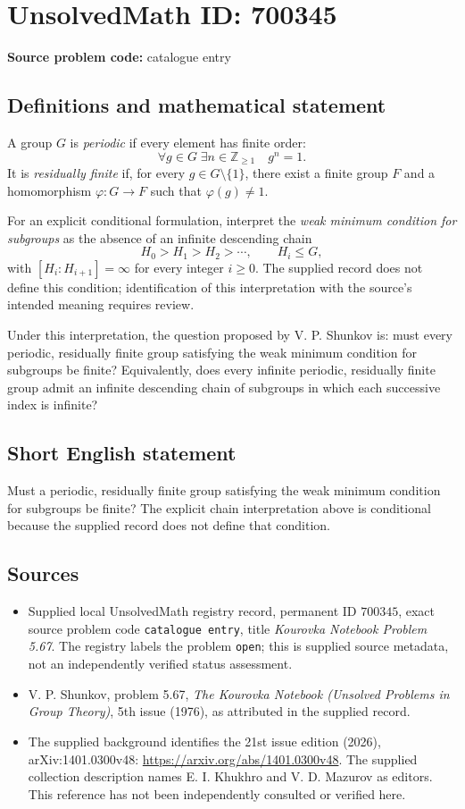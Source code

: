 \documentclass[11pt]{article}
\newcommand{\Z}{\mathbb{Z}}
\begin{document}
\section*{UnsolvedMath ID: 700345}
\textbf{Source problem code:} catalogue entry
\subsection{Definitions and mathematical statement}
A group \(G\) is \emph{periodic} if every element has finite order:
\[
\forall g\in G\;\exists n\in\Z_{\geq 1}\quad g^n=1.
\]
It is \emph{residually finite} if, for every \(g\in G\setminus\{1\}\), there exist a finite group \(F\) and a homomorphism \(\varphi:G\to F\) such that \(\varphi(g)\neq 1\).

For an explicit conditional formulation, interpret the \emph{weak minimum condition for subgroups} as the absence of an infinite descending chain
\[
H_0>H_1>H_2>\cdots,\qquad H_i\leq G,
\]
with \([H_i:H_{i+1}]=\infty\) for every integer \(i\geq0\). The supplied record does not define this condition; identification of this interpretation with the source's intended meaning requires review.

Under this interpretation, the question proposed by V. P. Shunkov is: must every periodic, residually finite group satisfying the weak minimum condition for subgroups be finite? Equivalently, does every infinite periodic, residually finite group admit an infinite descending chain of subgroups in which each successive index is infinite?
\subsection{Short English statement}
Must a periodic, residually finite group satisfying the weak minimum condition for subgroups be finite? The explicit chain interpretation above is conditional because the supplied record does not define that condition.
\subsection{Sources}
\begin{itemize}
\item Supplied local UnsolvedMath registry record, permanent ID \(700345\), exact source problem code \texttt{catalogue entry}, title \emph{Kourovka Notebook Problem 5.67}. The registry labels the problem \texttt{open}; this is supplied source metadata, not an independently verified status assessment.
\item V. P. Shunkov, problem 5.67, \emph{The Kourovka Notebook (Unsolved Problems in Group Theory)}, 5th issue (1976), as attributed in the supplied record.
\item The supplied background identifies the 21st issue edition (2026), arXiv:1401.0300v48: \url{https://arxiv.org/abs/1401.0300v48}. The supplied collection description names E. I. Khukhro and V. D. Mazurov as editors. This reference has not been independently consulted or verified here.
\end{itemize}
\end{document}
